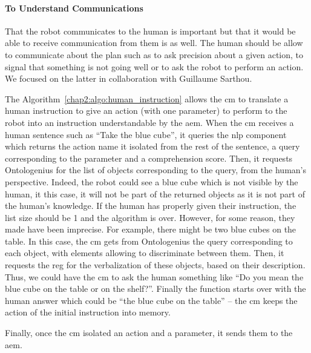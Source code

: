\documentclass[a4paper,11pt,twoside]{StyleThese}
\begin{document}
\paragraph{To Understand Communications}
That the robot communicates to the human is important but that it would be able to receive communication from them is as well. The human should be allow to communicate about the plan such as to ask precision about a given action, to signal that something is not going well or to ask the robot to perform an action. We focused on the latter in collaboration with Guillaume Sarthou. 

The Algorithm~\ref{chap2:algo:human_instruction} allows the \acrshort{cm} to translate a human instruction to give an action (with one parameter) to perform to the robot into an instruction understandable by the \acrlong{aem}. When the \acrshort{cm} receives a human sentence such as ``Take the blue cube'', it queries the \acrfull{nlp} component which returns the action name it isolated from the rest of the sentence, a \sparql query corresponding to the parameter and a comprehension score. Then, it requests Ontologenius for the list of objects corresponding to the \sparql query, from the human's perspective. Indeed, the robot could see a blue cube which is not visible by the human, it this case, it will not be part of the returned objects as it is not part of the human's knowledge. If the human has properly given their instruction, the list size should be 1 and the algorithm is over. However, for some reason, they made have been imprecise. For example, there might be two blue cubes on the table. In this case, the \acrshort{cm} gets from Ontologenius the \sparql query corresponding to each object, with elements allowing to discriminate between them. Then, it requests the \acrshort{reg} for the verbalization of these objects, based on their \sparql description. Thus, we could have the \acrshort{cm} to ask the human something like ``Do you mean the blue cube on the table or on the shelf?''. Finally the function starts over with the human answer which could be ``the blue cube on the table'' -- the \acrshort{cm} keeps the action of the initial instruction into memory.

Finally, once the \acrshort{cm} isolated an action and a parameter, it sends them to the \acrlong{aem}.
\end{document}
